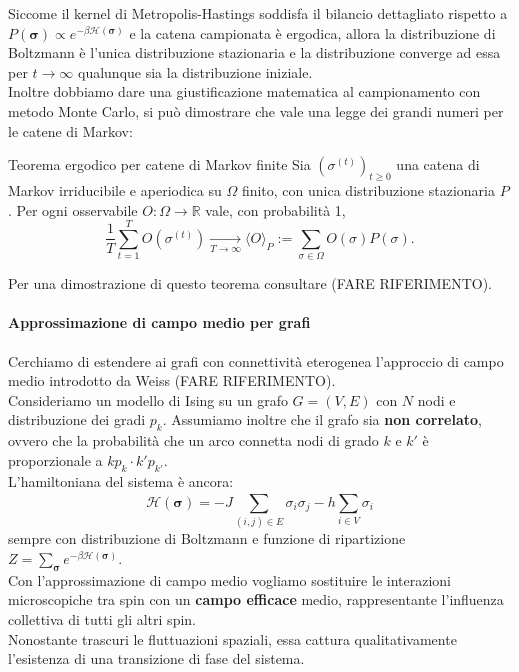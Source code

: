Siccome il kernel di Metropolis-Hastings soddisfa il bilancio dettagliato rispetto a $P (\mathbf{\sigma}) \propto e^{-\beta \mathcal{H(\mathbf{\sigma})}}$ e la catena campionata è ergodica, allora la distribuzione di Boltzmann è l'unica distribuzione stazionaria e la distribuzione converge ad essa per $t \to \infty$ qualunque sia la distribuzione iniziale.\\

Inoltre dobbiamo dare una giustificazione matematica al campionamento con metodo Monte Carlo, si può dimostrare che vale una legge dei grandi numeri per le catene di Markov:
\begin{boxl}{Teorema ergodico per catene di Markov finite}
Sia $(\sigma^{(t)})_{t\ge 0}$ una catena di Markov irriducibile e aperiodica
su $\Omega$ finito, con unica distribuzione stazionaria $P$.
Per ogni osservabile $O:\Omega\to\mathbb{R}$ vale, con probabilità 1,
\begin{equation}
\frac{1}{T}\sum_{t=1}^{T} O(\sigma^{(t)}) \xrightarrow[T\to\infty]{}
\langle O\rangle_P := \sum_{\sigma\in\Omega} O(\sigma)P(\sigma).
\end{equation}
\end{boxl}
Per una dimostrazione di questo teorema consultare (FARE RIFERIMENTO).


\paragraph{Approssimazione di campo medio per grafi}
Cerchiamo di estendere ai grafi con connettività eterogenea l'approccio di campo medio introdotto da Weiss (FARE RIFERIMENTO).\\

Consideriamo un modello di Ising su un grafo $G=(V,E)$ con $N$ nodi e distribuzione dei gradi $p_k$. Assumiamo inoltre che il grafo sia \textbf{non correlato}, ovvero che la probabilità che un arco connetta nodi di grado $k$ e $k'$ è proporzionale a $kp_k \cdot k'p_{k'}$.\\
L'hamiltoniana del sistema è ancora:
\begin{equation}
    \mathcal{H}(\mathbf{\sigma})=-J\sum_{(i,j) \in E}^{}\sigma_i \sigma_j -h \sum_{i \in V}^{}\sigma_i
\end{equation}
sempre con distribuzione di Boltzmann e funzione di ripartizione $Z=\sum_{\mathbf{\sigma}}^{}e^{-\beta \mathcal{H}(\mathbf{\sigma})}$.\\
Con l'approssimazione di campo medio vogliamo sostituire le interazioni microscopiche tra spin con un \textbf{campo efficace} medio, rappresentante l'influenza collettiva di tutti gli altri spin.\\
Nonostante trascuri le fluttuazioni spaziali, essa cattura qualitativamente l'esistenza di una transizione di fase del sistema.\\

